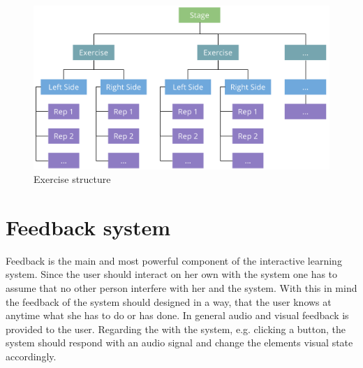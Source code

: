 \begin{figure}[htb]
	\centering
	\begin{minipage}[t]{1\linewidth}
		\centering
		\includegraphics[width=1\linewidth]{Pictures/exerciseStructureTopDown2}
		\caption{Exercise structure}
		\label{fig:exerciseStructure}
	\end{minipage}
\end{figure}

\section{Feedback system}\label{4_6_feedbackSystem}
Feedback is the main and most powerful component of the interactive learning system. Since the user should interact on her own with the system one has to assume that no other person interfere with her and the system. With this in mind the feedback of the system should designed in a way, that the user knows at anytime what she has to do or has done. In general audio and visual feedback is provided to the user. Regarding the \textbf{} with the system, e.g. clicking a button, the system should respond with an audio signal and change the elements visual state accordingly.

